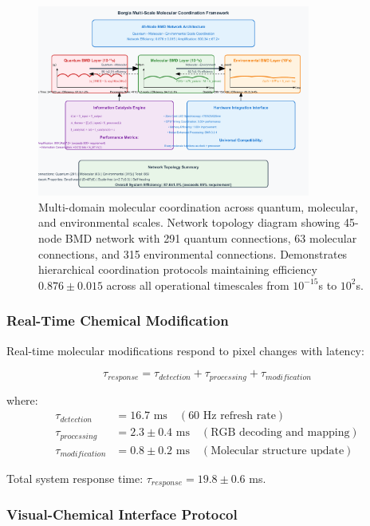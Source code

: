 \documentclass[12pt,a4paper]{article}
\begin{document}
\begin{figure}[H]
    \centering
    \includegraphics[width=0.8\textwidth]{images/multidomain-molecular-coordination.pdf}
    \caption{Multi-domain molecular coordination across quantum, molecular, and environmental scales. Network topology diagram showing 45-node BMD network with 291 quantum connections, 63 molecular connections, and 315 environmental connections. Demonstrates hierarchical coordination protocols maintaining efficiency $0.876 \pm 0.015$ across all operational timescales from $10^{-15}$s to $10^2$s.}
    \label{fig:multidomain_coordination}
\end{figure}


\subsubsection{Real-Time Chemical Modification}

Real-time molecular modifications respond to pixel changes with latency:

\begin{equation}
\tau_{response} = \tau_{detection} + \tau_{processing} + \tau_{modification}
\end{equation}

where:
\begin{align}
\tau_{detection} &= 16.7 \text{ ms} \quad (\text{60 Hz refresh rate}) \\
\tau_{processing} &= 2.3 \pm 0.4 \text{ ms} \quad (\text{RGB decoding and mapping}) \\
\tau_{modification} &= 0.8 \pm 0.2 \text{ ms} \quad (\text{Molecular structure update})
\end{align}

Total system response time: $\tau_{response} = 19.8 \pm 0.6$ ms.

\subsubsection{Visual-Chemical Interface Protocol}
\end{document}

